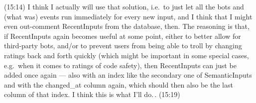 \documentclass{report}
\begin{document}

(15:14) I think I actually will use that solution, i.e.\ to just let all the bots and (what was) events run immediately for every new input, and I think that I might even out-comment RecentInputs from the database, then. The reasoning is that, if RecentInputs again becomes useful at some point, either to better allow for third-party bots, and/or to prevent users from being able to troll by changing ratings back and forth quickly (which might be important in some special cases, e.g.\ when it comes to ratings of code safety), then RecentInputs can just be added once again --- also with an index like the secondary one of SemanticInputs and with the changed\_at column again, which should then also be the last column of that index. I think this is what I'll do.\,. (15:19)

\end{document}
